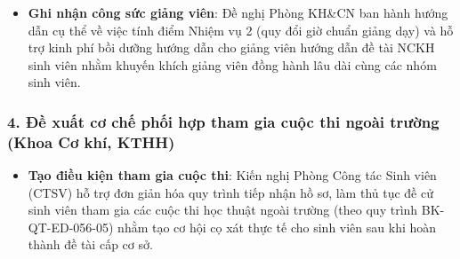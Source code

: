 \documentclass[11pt,a4paper]{article}
\providecommand{\tightlist}{%
  \setlength{\itemsep}{0pt}\setlength{\parskip}{0pt}}
\begin{document}
\begin{itemize}
\tightlist
\item
  \textbf{Ghi nhận công sức giảng viên}: Đề nghị Phòng KH\&CN ban hành
  hướng dẫn cụ thể về việc tính điểm Nhiệm vụ 2 (quy đổi giờ chuẩn giảng
  dạy) và hỗ trợ kinh phí bồi dưỡng hướng dẫn cho giảng viên hướng dẫn
  đề tài NCKH sinh viên nhằm khuyến khích giảng viên đồng hành lâu dài
  cùng các nhóm sinh viên.
\end{itemize}

\subsubsection{4. Đề xuất cơ chế phối hợp tham gia cuộc thi ngoài trường
(Khoa Cơ khí,
KTHH)}\label{ux111ux1ec1-xuux1ea5t-cux1a1-chux1ebf-phux1ed1i-hux1ee3p-tham-gia-cuux1ed9c-thi-ngouxe0i-trux1b0ux1eddng-khoa-cux1a1-khuxed-kthh}

\begin{itemize}
\tightlist
\item
  \textbf{Tạo điều kiện tham gia cuộc thi}: Kiến nghị Phòng Công tác
  Sinh viên (CTSV) hỗ trợ đơn giản hóa quy trình tiếp nhận hồ sơ, làm
  thủ tục đề cử sinh viên tham gia các cuộc thi học thuật ngoài trường
  (theo quy trình BK-QT-ED-056-05) nhằm tạo cơ hội cọ xát thực tế cho
  sinh viên sau khi hoàn thành đề tài cấp cơ sở.
\end{itemize}
\end{document}
